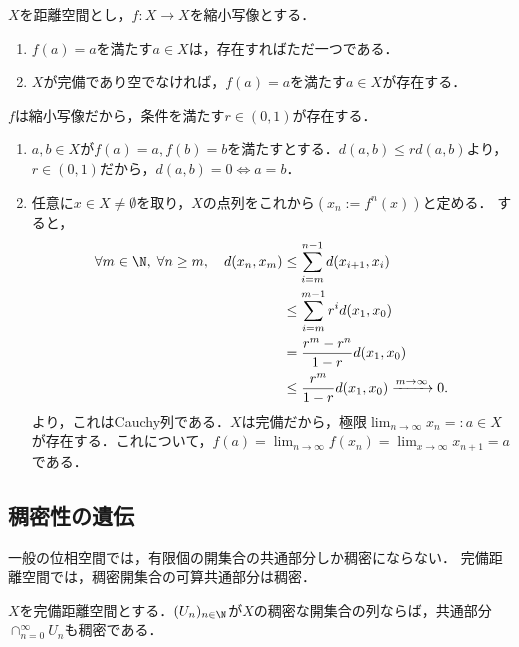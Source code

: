\documentclass[uplatex,dvipdfmx]{jsreport}
\begin{document}
\begin{proposition}[完備距離空間の縮小写像には不動点が存在する]
    $X$を距離空間とし，$f:X\to X$を縮小写像とする．
    \begin{enumerate}
        \item $f(a)=a$を満たす$a\in X$は，存在すればただ一つである．
        \item $X$が完備であり空でなければ，$f(a)=a$を満たす$a\in X$が存在する．
    \end{enumerate}
\end{proposition}
\begin{Proof}
    $f$は縮小写像だから，条件を満たす$r\in(0,1)$が存在する．
    \begin{enumerate}
        \item $a,b\in X$が$f(a)=a,f(b)=b$を満たすとする．$d(a,b)\le rd(a,b)$より，$r\in(0,1)$だから，$d(a,b)=0\Leftrightarrow a=b$．
        \item 任意に$x\in X\ne\emptyset$を取り，$X$の点列をこれから$(x_n:=f^n(x))$と定める．
        すると，
        \begin{align*}
            \forall m\in\N,\;\forall n\ge m,\quad d(x_n,x_m)&\le \sum^{n-1}_{i=m}d(x_{i+1},x_i)\\
            &\le \sum^{m-1}_{i=m}r^id(x_1,x_0)\\
            &=\frac{r^m-r^n}{1-r}d(x_1,x_0)\\
            &\le \frac{r^m}{1-r}d(x_1,x_0)\xrightarrow{m\to\infty}0.
        \end{align*}
        より，これはCauchy列である．$X$は完備だから，極限$\lim_{n\to\infty}x_n=:a\in X$が存在する．これについて，$f(a)=\lim_{n\to\infty}f(x_n)=\lim_{x\to\infty}x_{n+1}=a$である．
    \end{enumerate}
\end{Proof}

\subsection{稠密性の遺伝}

\begin{tcolorbox}[colframe=ForestGreen, colback=ForestGreen!10!white,breakable,colbacktitle=ForestGreen!40!white,coltitle=black,fonttitle=\bfseries\sffamily,
title=Baireの定理]
    一般の位相空間では，有限個の開集合の共通部分しか稠密にならない．
    完備距離空間では，稠密開集合の可算共通部分は稠密．
\end{tcolorbox}

\begin{proposition}[AC, 完備距離異空間の稠密開集合の可算共通部分は稠密]
    $X$を完備距離空間とする．$(U_n)_{n\in\N}$が$X$の稠密な開集合の列ならば，共通部分$\cap_{n=0}^\infty U_n$も稠密である．
\end{proposition}
\end{document}
